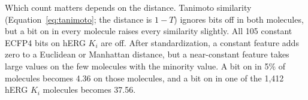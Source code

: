Which count matters depends on the distance. Tanimoto similarity (Equation~\ref{eq:tanimoto}; the distance is $1-T$) ignores bits off in both molecules, but a bit on in every molecule raises every similarity slightly. All 105 constant ECFP4 bits on hERG $K_i$ are off. After standardization, a constant feature adds zero to a Euclidean or Manhattan distance, but a near-constant feature takes large values on the few molecules with the minority value. A bit on in 5\% of molecules becomes 4.36 on those molecules, and a bit on in one of the 1,412 hERG $K_i$ molecules becomes 37.56.




